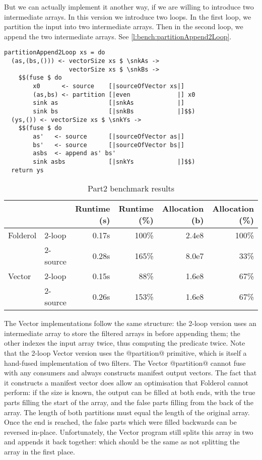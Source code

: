 But we can actually implement it another way, if we are willing to introduce two intermediate arrays.
In this version we introduce two loops.
In the first loop, we partition the input into two intermediate arrays.
Then in the second loop, we append the two intermediate arrays.
See \autoref{l:bench:partitionAppend2Loop}.

\begin{lstlisting}[float,label=l:bench:partitionAppend2Loop,caption=Partition / append with two loops]
partitionAppend2Loop xs = do
  (as,(bs,())) <- vectorSize xs $ \snkAs ->
                  vectorSize xs $ \snkBs ->
    $$(fuse $ do
        x0      <- source    [|sourceOfVector xs|]
        (as,bs) <- partition [|even             |] x0
        sink as              [|snkAs            |]
        sink bs              [|snkBs            |]$$)
  (ys,()) <- vectorSize xs $ \snkYs ->
    $$(fuse $ do
        as'   <- source      [|sourceOfVector as|]
        bs'   <- source      [|sourceOfVector bs|]
        asbs  <- append as' bs'
        sink asbs            [|snkYs            |]$$)
  return ys
\end{lstlisting}

\begin{table}
\begin{center}
\begin{tabular}{ll|rrrr}
& & Runtime (s)  & Runtime (\%) & Allocation (b) & Allocation (\%) \\
\hline
Folderol & 2-loop   & 0.17s &   100\% & 2.4e8 & 100\% \\
         & 2-source & 0.28s &   165\% & 8.0e7 &  33\% \\
Vector   & 2-loop   & 0.15s &    88\% & 1.6e8 &  67\% \\
         & 2-source & 0.26s &   153\% & 1.6e8 &  67\% \\
\end{tabular}
\end{center}
\caption[Part2 benchmark results]{Part2 benchmark results}
\label{table:bench:part2}
\end{table}

The Vector implementations follow the same structure: the 2-loop version uses an intermediate array to store the filtered arrays in before appending them; the other indexes the input array twice, thus computing the predicate twice.
Note that the 2-loop Vector version uses the @partition@ primitive, which is itself a hand-fused implementation of two filters.
The Vector @partition@ cannot fuse with any consumers and always constructs manifest output vectors.
The fact that it constructs a manifest vector does allow an optimisation that Folderol cannot perform: if the size is known, the output can be filled at both ends, with the true parts filling the start of the array, and the false parts filling from the back of the array.
The length of both partitions must equal the length of the original array.
Once the end is reached, the false parts which were filled backwards can be reversed in-place.
Unfortunately, the Vector program still splits this array in two and appends it back together: which should be the same as not splitting the array in the first place.

